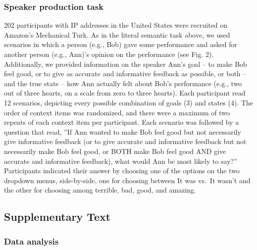 \documentclass[floatsintext,man]{apa6}
\theoremstyle{definition}
\theoremstyle{definition}
\theoremstyle{definition}
\theoremstyle{remark}
\begin{document}
\subsubsection{Speaker production task}\label{speaker-production-task}

202 participants with IP addresses in the United States were recruited
on Amazon's Mechanical Turk. As in the literal semantic task above, we
used scenarios in which a person (e.g., Bob) gave some performance and
asked for another person (e.g., Ann)'s opinion on the performance (see
Fig. 2). Additionally, we provided information on the speaker Ann's goal
-- to make Bob feel good, or to give as accurate and informative
feedback as possible, or both -- and the true state -- how Ann actually
felt about Bob's performance (e.g., two out of three hearts, on a scale
from zero to three hearts). Each participant read 12 scenarios,
depicting every possible combination of goals (3) and states (4). The
order of context items was randomized, and there were a maximum of two
repeats of each context item per participant. Each scenario was followed
by a question that read, ''If Ann wanted to make Bob feel good but not
necessarily give informative feedback (or to give accurate and
informative feedback but not necessarily make Bob feel good, or BOTH
make Bob feel good AND give accurate and informative feedback), what
would Ann be most likely to say?'' Participants indicated their answer
by choosing one of the options on the two dropdown menus, side-by-side,
one for choosing between It was vs.~It wasn't and the other for choosing
among terrible, bad, good, and amazing.

\subsection{Supplementary Text}\label{supplementary-text}

\subsubsection{Data analysis}\label{data-analysis}
\end{document}

